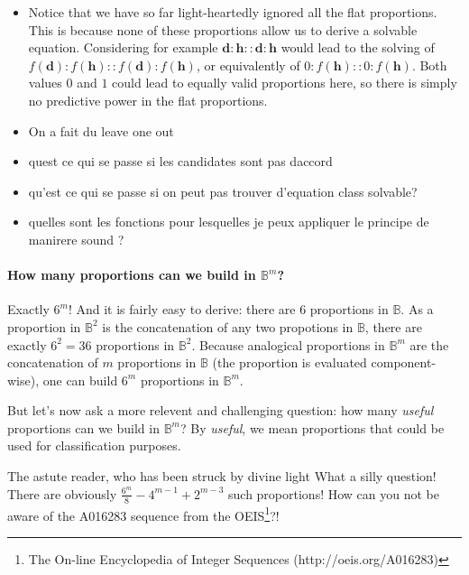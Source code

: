 \begin{itemize}
  \item Notice that we have so far light-heartedly ignored  all the flat
    proportions.  This is because none of these proportions allow us to derive
    a solvable equation. Considering for example $\mathbf{d} : \mathbf{h} ::
    \mathbf{d} : \mathbf{h}$ would lead to the solving of $f(\mathbf{d}) :
    f(\mathbf{h}) :: f(\mathbf{d}) : f(\mathbf{h})$, or equivalently of $0 :
    f(\mathbf{h}) :: 0 : f(\mathbf{h})$. Both values $0$ and $1$ could lead to
    equally valid proportions here, so there is simply no predictive power in
    the flat proportions.

  \item On a fait du leave one out
  \item quest ce qui se passe si les candidates sont pas daccord
  \item qu'est ce qui se passe si on peut pas trouver d'equation class
    solvable?
  \item quelles sont les fonctions pour lesquelles je peux appliquer le
    principe de manirere sound ?
  
\end{itemize}

\paragraph{How many proportions can we build in $\mathbb{B}^m$?\\}

Exactly $6^m$! And it is fairly easy to derive: there are $6$ proportions in
$\mathbb{B}$. As a proportion in $\mathbb{B}^2$ is the concatenation of any
two propotions in $\mathbb{B}$, there are exactly $6^2 = 36$ proportions in
$\mathbb{B}^2$. Because analogical proportions in $\mathbb{B}^m$ are the
concatenation of $m$ proportions in $\mathbb{B}$ (the proportion is evaluated
component-wise), one can build $6^m$ proportions in $\mathbb{B}^m$.

But let's now ask a more relevent and challenging question: how many
\textit{useful} proportions can we build in $\mathbb{B}^m$? By \textit{useful},
we mean proportions that could be used for classification purposes.

\begin{aquote}{The astute reader, who has been struck by divine light}
  What a silly question! There are obviously $\frac{6^m}{8} - 4^{m - 1} + 2^{m
  - 3}$ such proportions! How can you not be aware of the A016283 sequence from
  the OEIS\footnote{The On-line Encyclopedia of Integer Sequences
  (http://oeis.org/A016283)}?!
\end{aquote}

